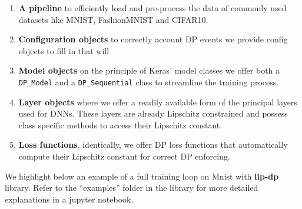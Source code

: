 \begin{enumerate}
    \item \textbf{A pipeline} to efficiently load and pre-process the data of commonly used datasets like MNIST, FashionMNIST and CIFAR10. 
    \item \textbf{Configuration objects} to correctly account DP events we provide config objects to fill in that will 
    \item \textbf{Model objects} on the principle of Keras' model classes we offer both a \lstinline[basicstyle=\ttfamily, backgroundcolor=\color{gray!20}]{DP_Model} and a \lstinline[basicstyle=\ttfamily, backgroundcolor=\color{gray!20}]{DP_Sequential} class to streamline the training process. 
    \item \textbf{Layer objects} where we offer a readily available form of the principal layers used for DNNs. These layers are already Lipschitz constrained and possess class specific methods to access their Lipschitz constant. 
    \item \textbf{Loss functions}, identically, we offer DP loss functions that automatically compute their Lipschitz constant for correct DP enforcing.
\end{enumerate}

We highlight below an example of a full training loop on Mnist with \textbf{lip-dp} library. Refer to the ``examples'' folder in the library for more detailed explanations in a jupyter notebook.  


